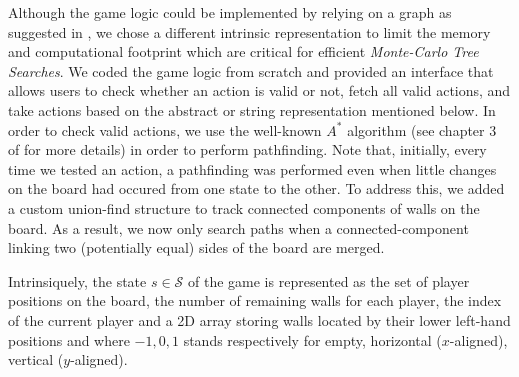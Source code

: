 \documentclass[journal, a4paper]{IEEEtran}
\begin{document}
Although the game logic could be implemented by relying on a graph as suggested in \cite{heuristic-agent}, we chose a different intrinsic representation to limit the memory and computational footprint which are critical for efficient \textit{Monte-Carlo Tree Searches}. We coded the game logic from scratch and provided an interface that allows users to check whether an action is valid or not, fetch all valid actions, and take actions based on the abstract or string representation mentioned below. In order to check valid actions, we use the well-known $A^*$ algorithm (see chapter 3 of \cite{russel2010} for more details) in order to perform pathfinding. Note that, initially, every time we tested an action, a pathfinding was performed even when little changes on the board had occured from one state to the other. To address this, we added a custom union-find structure to track connected components of walls on the board. As a result, we now only search paths when a connected-component linking two (potentially equal) sides of the board are merged.

Intrinsiquely, the state $s\in\mathcal{S}$ of the game is represented as the set of player positions on the board, the number of remaining walls for each player, the index of the current player and a 2D array storing walls located by their lower left-hand positions and where $-1, 0, 1$ stands respectively for empty, horizontal ($x$-aligned), vertical ($y$-aligned).
\end{document}
